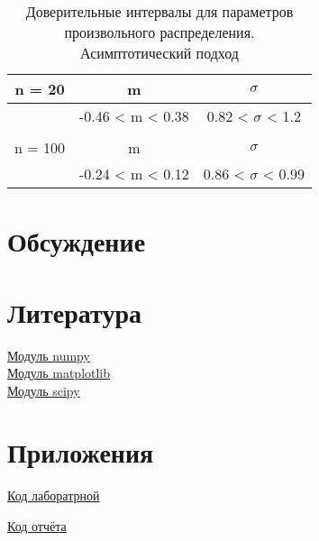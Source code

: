 \documentclass[a4]{article}
\begin{document}
		\begin{table}[h!]
			
			\caption{Доверительные интервалы для параметров произвольного распределения. Асимптотический подход}
			\label{tab:my_label}
			\begin{center}
				\vspace{5mm}
				
				\begin{tabular}{|c|c|c|}
					\hline
					n = 20 & m & $\sigma$\\
					\hline
					& -0.46 < m < 0.38 & 0.82 < $\sigma$ < 1.2\\ 
					\hline
					& & \\
					\hline
					n = 100 & m & $\sigma$\\
					\hline
					& -0.24 < m < 0.12 & 0.86 < $\sigma$ < 0.99\\
					\hline
				\end{tabular}
			\end{center}
		\end{table}

	\section{Обсуждение}
		
	\section{Литература}
	
	\href{https://physics.susu.ru/vorontsov/language/numpy.html}{Модуль numpy}\\
	
	\href{https://matplotlib.org/}{Модуль matplotlib}\\
	
	\href{https://www.scipy.org/}{Модуль scipy}\\
	
	\section{Приложения}
	
	\href{https://github.com/LuciusGen/Matstat/blob/master/Lab6/Lab8.py}{Код лаборатрной}
	
	\href{https://github.com/LuciusGen/Matstat/blob/master/Lab6/lab8.tex}{Код отчёта}
	
\end{document}
